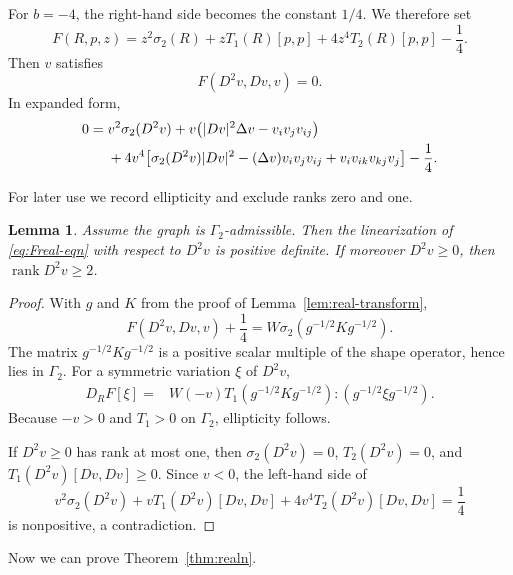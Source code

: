 \documentclass{article}
\newtheorem{lemma}[theorem]{Lemma}
\newcommand{\rank}{\operatorname{rank}}
\numberwithin{equation}{section}
\begin{document}
For $b=-4$, the right-hand side becomes the constant $1/4$. We therefore set
\begin{equation}\label{eq:Freal}
F(R,p,z)
=z^2\sigma_2(R)+zT_1(R)[p,p]+4z^4T_2(R)[p,p]-\frac14.
\end{equation}
Then $v$ satisfies
\begin{equation}\label{eq:Freal-eqn}
F(D^2v,Dv,v)=0.
\end{equation}
In expanded form,
\begin{align}
0={}&v^2\sigma_2(D^2v)
+v\bigl(|Dv|^2\Delta v-v_iv_jv_{ij}\bigr)\notag\\
&+4v^4\bigl[
\sigma_2(D^2v)|Dv|^2-(\Delta v)v_iv_jv_{ij}+v_iv_{ik}v_{kj}v_j
\bigr]-\frac14.
\label{eq:Freal-expanded}
\end{align}

For later use we record ellipticity and exclude ranks zero and one.

\begin{lemma}\label{lem:real-ellipticity}
Assume the graph is $\Gamma_2$-admissible. Then the linearization of \eqref{eq:Freal-eqn} with respect to $D^2v$ is positive definite. If moreover $D^2v\ge0$, then $\rank D^2v\ge2$.
\end{lemma}

\begin{proof}
With $g$ and $K$ from the proof of Lemma~\ref{lem:real-transform},
\begin{equation}\label{eq:Freal-symmetric}
F(D^2v,Dv,v)+\frac14
=W\sigma_2(g^{-1/2}Kg^{-1/2}).
\end{equation}
The matrix $g^{-1/2}Kg^{-1/2}$ is a positive scalar multiple of the shape operator, hence lies in $\Gamma_2$. For a symmetric variation $\xi$ of $D^2v$,
\begin{align}
D_RF[\xi]
={}&W(-v)T_1(g^{-1/2}Kg^{-1/2}):
(g^{-1/2}\xi g^{-1/2}).
\label{eq:real-linearization}
\end{align}
Because $-v>0$ and $T_1>0$ on $\Gamma_2$, ellipticity follows.

If $D^2v\ge0$ has rank at most one, then $\sigma_2(D^2v)=0$, $T_2(D^2v)=0$, and $T_1(D^2v)[Dv,Dv]\ge0$. Since $v<0$, the left-hand side of
\[
v^2\sigma_2(D^2v)+vT_1(D^2v)[Dv,Dv]+4v^4T_2(D^2v)[Dv,Dv]=\frac14
\]
is nonpositive, a contradiction.
\end{proof}

Now we can prove Theorem~\ref{thm:realn}.
\end{document}
